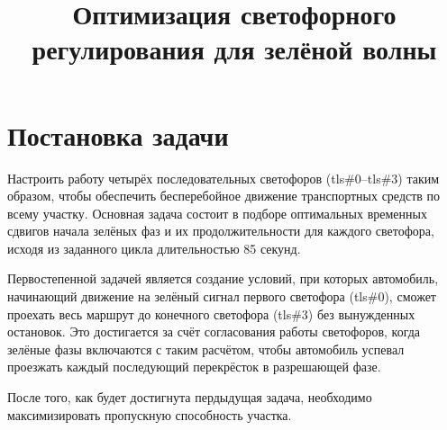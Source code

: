 \documentclass{article}
\title{Оптимизация светофорного регулирования для зелёной волны}
\author{}
\date{}
\begin{document}
\maketitle
\thispagestyle{empty}
\newpage
\tableofcontents
\newpage
\section{Постановка задачи}
Настроить работу четырёх последовательных светофоров (tls\#0–tls\#3) таким образом, чтобы обеспечить бесперебойное движение транспортных средств по всему участку. Основная задача состоит в подборе оптимальных временных сдвигов начала зелёных фаз и их продолжительности для каждого светофора, исходя из заданного цикла длительностью 85 секунд.
\par Первостепенной задачей является создание условий, при которых автомобиль, начинающий движение на зелёный сигнал первого светофора (tls\#0), сможет проехать весь маршрут до конечного светофора (tls\#3) без вынужденных остановок. Это достигается за счёт согласования работы светофоров, когда зелёные фазы включаются с таким расчётом, чтобы автомобиль успевал проезжать каждый последующий перекрёсток в разрешающей фазе.
\par После того, как будет достигнута пердыдущая задача, необходимо максимизировать пропускную способность участка.
\newpage
\end{document}
